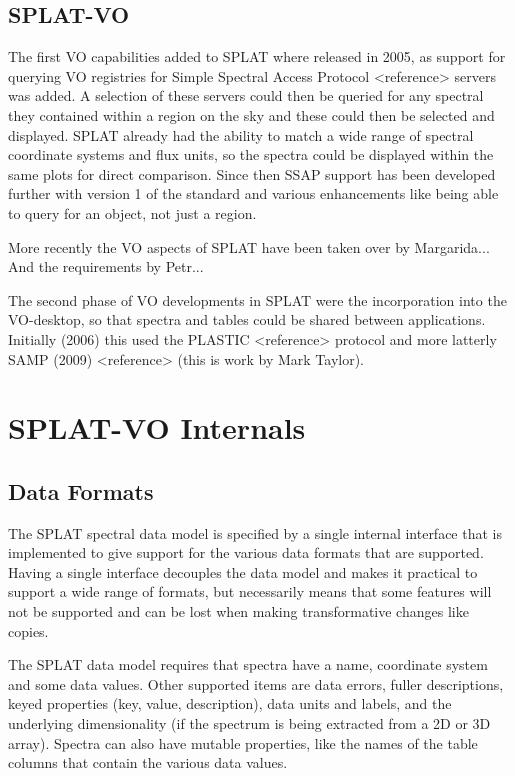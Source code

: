 \documentclass[final,authoryear,5p,times,twocolumn]{elsarticle}
\begin{document}
\subsection{SPLAT-VO}
The first VO capabilities added to SPLAT where released in 2005, as support
for querying VO registries for Simple Spectral Access Protocol <reference>
servers was added. A selection of these servers could then be queried for any
spectral they contained within a region on the sky and these could then be
selected and displayed. SPLAT already had the ability to match a wide range of
spectral coordinate systems and flux units, so the spectra could be displayed
within the same plots for direct comparison. Since then SSAP support has been
developed further with version 1 of the standard and various enhancements like
being able to query for an object, not just a region.

More recently the VO aspects of SPLAT have been taken over by Margarida...
And the requirements by Petr...

The second phase of VO developments in SPLAT were the incorporation into the
VO-desktop, so that spectra and tables could be shared between applications.
Initially (2006) this used the PLASTIC <reference> protocol and more latterly
SAMP (2009) <reference> (this is work by Mark Taylor).

\section{SPLAT-VO Internals}

\subsection{Data Formats}

The SPLAT spectral data model is specified by a single internal interface that
is implemented to give support for the various data formats that are
supported. Having a single interface decouples the data model and makes it
practical to support a wide range of formats, but necessarily means that some
features will not be supported and can be lost when making transformative
changes like copies.

The SPLAT data model requires that spectra have a name, coordinate system and
some data values. Other supported items are data errors, fuller descriptions,
keyed properties (key, value, description), data units and labels, and the
underlying dimensionality (if the spectrum is being extracted from a 2D or 3D
array). Spectra can also have mutable properties, like the names of the table
columns that contain the various data values.
\end{document}
